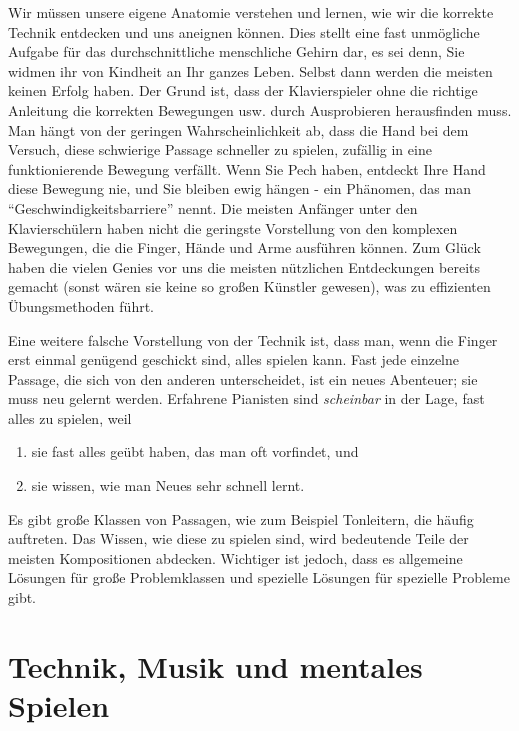 Wir müssen unsere eigene Anatomie verstehen und lernen, wie wir die korrekte Technik entdecken und uns aneignen können.
Dies stellt eine fast unmögliche Aufgabe für das durchschnittliche menschliche Gehirn dar, es sei denn, Sie widmen ihr von Kindheit an Ihr ganzes Leben.
Selbst dann werden die meisten keinen Erfolg haben.
Der Grund ist, dass der Klavierspieler ohne die richtige Anleitung die korrekten Bewegungen usw. durch Ausprobieren herausfinden muss.
Man hängt von der geringen Wahrscheinlichkeit ab, dass die Hand bei dem Versuch, diese schwierige Passage schneller zu spielen, zufällig in eine funktionierende Bewegung verfällt.
Wenn Sie Pech haben, entdeckt Ihre Hand diese Bewegung nie, und Sie bleiben ewig hängen - ein Phänomen, das man \enquote{Geschwindigkeitsbarriere} nennt.
Die meisten Anfänger unter den Klavierschülern haben nicht die geringste Vorstellung von den komplexen Bewegungen, die die Finger, Hände und Arme ausführen können.
Zum Glück haben die vielen Genies vor uns die meisten nützlichen Entdeckungen bereits gemacht (sonst wären sie keine so großen Künstler gewesen), was zu effizienten Übungsmethoden führt.

Eine weitere falsche Vorstellung von der Technik ist, dass man, wenn die Finger erst einmal genügend geschickt sind, alles spielen kann.
Fast jede einzelne Passage, die sich von den anderen unterscheidet, ist ein neues Abenteuer; sie muss neu gelernt werden.
Erfahrene Pianisten sind \textit{scheinbar} in der Lage, fast alles zu spielen, weil

\begin{enumerate}[label={\arabic*.}] 
 \item sie fast alles geübt haben, das man oft vorfindet, und
 \item sie wissen, wie man Neues sehr schnell lernt.
\end{enumerate}

Es gibt große Klassen von Passagen, wie zum Beispiel Tonleitern, die häufig auftreten.
Das Wissen, wie diese zu spielen sind, wird bedeutende Teile der meisten Kompositionen abdecken.
Wichtiger ist jedoch, dass es allgemeine Lösungen für große Problemklassen und spezielle Lösungen für spezielle Probleme gibt.


\section{Technik, Musik und mentales Spielen}
\label{c1i3}

